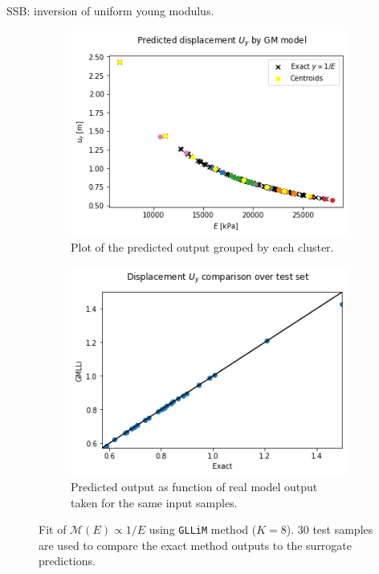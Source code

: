 	\begin{frame}{SSB: inversion of uniform young modulus.}
	\begin{figure}
	\begin{subfigure}{.45\textwidth}
	\includegraphics[width=\textwidth]{graphs/E_single/bayes_inversion_model_fit_view.png}
	\caption{Plot of the predicted output grouped by each cluster.}
	\end{subfigure}
	\begin{subfigure}{.45\textwidth}
	\includegraphics[width=\textwidth]{graphs/E_single/bayes_inversion_test_fit.png}
	\caption{Predicted output as function of real model output taken for the same input samples.}
	\end{subfigure}
	\caption{Fit of $\mathcal{M}(E) \propto 1/E$ using \texttt{GLLiM} method ($K=8$). 30 test samples are used to compare the exact method outputs to the surrogate predictions.}
	\end{figure}
	\end{frame}
	
